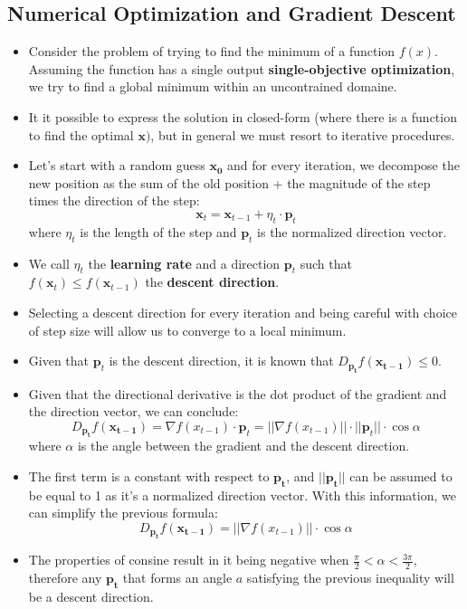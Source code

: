 \documentclass{article}
\newcommand{\tbf}[1]{\textbf{#1}}
\newcommand{\mbf}[1]{\mathbf{#1}}
\begin{document}
\subsection{Numerical Optimization and Gradient Descent}
\begin{itemize}
    \item Consider the problem of trying to find the minimum of a function $f(x)$. Assuming the function has a single output \tbf{single-objective optimization}, we try to find a global minimum within an uncontrained domaine.
    \item It it possible to express the solution in closed-form (where there is a function to find the optimal $\mbf{x})$, but in general we must resort to iterative procedures. 
    \item Let's start with a random guess $\mbf{x_0}$ and for every iteration, we decompose the new position as the sum of the old position  + the magnitude of the step times the direction of the step:
    \[\mbf{x}_t = \mbf{x}_{t-1} + \eta_t \cdot \mbf{p}_t\]
    where $\eta_t$ is the length of the step and $\mbf{p}_t$ is the normalized direction vector.
    \item We call $\eta_t$ the \tbf{learning rate} and a direction $\mbf{p}_t$ such that $f(\mbf{x}_t) \leq f(\mbf{x}_{t-1})$ the \tbf{descent direction}.
    \item Selecting a descent direction for every iteration and being careful with choice of step size will allow us to converge to a local minimum.
    \item Given that $\mbf{p}_t$ is the descent direction, it is known that $D_{\mbf{p_t}} f(\mbf{x_{t-1}}) \leq 0$.
    \item Given that the directional derivative is the dot product of the gradient and the direction vector, we can conclude:
    \[D_{\mbf{p_t}} f(\mbf{x_{t-1}}) = \nabla f(x_{t-1}) \cdot \mbf{p}_t = ||\nabla f(x_{t-1})|| \cdot ||\mbf{p}_t|| \cdot \cos \alpha \]
    where $\alpha$ is the angle between the gradient and the descent direction. 
    \item The first term is a constant with respect to $\mbf{p_t}$, and $||\mbf{p_t}||$ can be assumed to be equal to 1 as it's a normalized direction vector. With this information, we can simplify the previous formula:
    \[D_{\mbf{p_t}} f(\mbf{x_{t-1}}) = ||\nabla f(x_{t-1})||  \cdot \cos \alpha \]
    \item The properties of consine result in it being negative when  $\frac{\pi}{2} < \alpha < \frac{3 \pi}{2}$, therefore any $\mbf{p_t}$ that forms an angle $a$ satisfying the previous inequality will be a descent direction.

\end{itemize}
\end{document}
